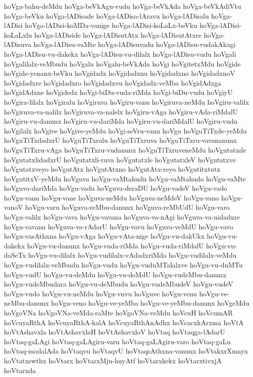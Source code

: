 {hoVga-bahu-deMdu
hoVga-beVkAgu-vudu
hoVga-beVkAda
hoVga-beVkAdiVtu
hoVga-beVku
hoVga-lADisade
hoVga-lADisa-lAravu
hoVga-lADisalu
hoVga-lADisi
hoVga-lADisi-koMDa-vanige
hoVga-lADisi-koLaLx-beVku
hoVga-lADisi-koLaLxlu
hoVga-lADiside
hoVga-lADisutAtx
hoVga-lADisutAtxre
hoVga-lADisuva
hoVga-lADisu-vaMte
hoVga-lADisuvadu
hoVga-lADisu-vudakAkxgi
hoVga-lADisu-vu-dakekx
hoVga-lADisu-vu-dilalx
hoVga-lADisu-vudu
hoVgali
hoVgalilalx-veMbudu
hoVgalu
hoVgalu-beVkAda
hoVgi
hoVgitetxMdu
hoVgide
hoVgide-yenanx-beVku
hoVgidadx
hoVgidadxnu
hoVgidadxno
hoVgidadxnoV
hoVgidadxre
hoVgidadxro
hoVgidadxvu
hoVgidadx-veMba
hoVgidAdxga
hoVgidAdxne
hoVgidedx
hoVgi-biDu-vuda-riMda
hoVgi-biDu-vudu
hoVgiyU
hoVgira-lilalx
hoVgiralu
hoVgiruva
hoVgiru-vanu
hoVgiruva-neMdu
hoVgiru-valilx
hoVgiruva-va-nalilx
hoVgiruva-va-nalelx
hoVgiru-vAga
hoVgiru-vAda-riMdalU
hoVgiru-vu-danunx
hoVgiru-vu-dariMda
hoVgiru-vu-dariMdalU
hoVgiru-vudu
hoVgilalx
hoVgive
hoVgive-yeMdu
hoVgi-seVru-vanu
hoVgu
hoVguTiTxde-yeMdu
hoVguTiTxdadxrU
hoVguTiTxralu
hoVguTiTxruva
hoVguTiTxru-vavananunx
hoVguTiTxru-vAga
hoVguTiTxru-vudanunx
hoVguTiTxruveneMdu
hoVgutatxde
hoVgutatxlidadxrU
hoVgutatxli-ruva
hoVgutatxle
hoVgutatxleV
hoVgutatxve
hoVgutatxveyo
hoVgutAtx
hoVgutAtxno
hoVgutAtx-reyo
hoVgutitxtutx
hoVgutitxV-yeMdu
hoVguva
hoVgu-vaMtahudu
hoVgu-vaMtahudo
hoVgu-vaMte
hoVguva-dariMda
hoVgu-vadu
hoVguva-deraDU
hoVgu-vadeV
hoVgu-vado
hoVgu-vanu
hoVgu-vane
hoVguva-neMdu
hoVguva-neMdeV
hoVgu-vano
hoVgu-vanoV
hoVgu-varu
hoVguva-reMbu-danunx
hoVguva-reMbUdU
hoVgu-varo
hoVgu-valilx
hoVgu-vava
hoVgu-vavana
hoVguva-va-nAgi
hoVguva-va-nidadxre
hoVgu-vavanu
hoVguva-va-rAdarU
hoVgu-vavu
hoVguva-veMdU
hoVgu-vavo
hoVgu-vasAthxna
hoVgu-vAga
hoVgu-vAta-nige
hoVgu-vu-dakUkx
hoVgu-vu-dakekx
hoVgu-vu-danunx
hoVgu-vuda-riMda
hoVgu-vuda-riMdalU
hoVgu-vu-daSeTx
hoVgu-vu-dilalx
hoVgu-vudilalx-vAdadxriMda
hoVgu-vudilalx-veMdu
hoVgu-vudilalx-veMbudu
hoVgu-vudu
hoVgu-vuduMTalalxve
hoVgu-vu-duMTu
hoVgu-vudU
hoVgu-vu-deMdu
hoVgu-vu-deMdU
hoVgu-vudeMbu-danunx
hoVgu-vudeMbudara
hoVgu-vu-deMbudu
hoVgu-vudeMbudeV
hoVgu-vudeV
hoVgu-vudo
hoVgu-vu-neMdu
hoVgu-vuvu
hoVguve
hoVgu-venu
hoVgu-ve-neMbu-danunx
hoVgu-veno
hoVgu-ve-yeMba
hoVgu-ve-yeMbu-danunx
hoVgeMdu
hoVgoVNa
hoVgoVNa-veMda-raMte
hoVgoVNa-veMdu
hoVcuH
hoVcumAR
hoVcuyaRthA
hoVcuyaRthA-kalA
hoVcuyaRthAnAdhx
hoVcacxkArxma
hoVtA
hoVtAshavxla
hoVtAshavxlaH
hoVtAshavxloV
hoVtaq
hoVtaqga-lAdarU
hoVtaq-gaLAgi
hoVtaq-gaLAgiru-varu
hoVtaq-gaLAgiru-varo
hoVtaq-gaLu
hoVtaq-modalAda
hoVtaqvu
hoVtaqvU
hoVtaqsAthxna-vanunx
hoVtakxrXmayx
hoVtatxswthx
hoVtarx
hoVtarxMju-huyAtf
hoVtarxkekx
hoVtarxtivxjA
hoVtarxda
}

